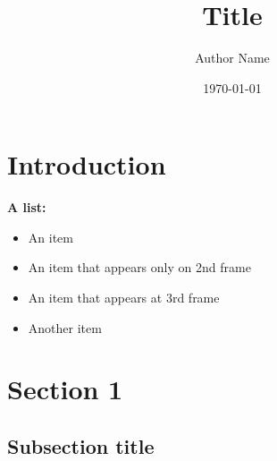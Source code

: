 \documentclass[compress]{beamer}
\title[Short Title]{Title}
\author[Short Author name]{Author Name}
\institute{X group}
\date{\today}
\begin{document}
\begin{frame}
\titlepage

\end{frame}
 
\section{Introduction}

\begin{frame}

\textbf{A list:}
\begin{itemize}
\item An item
\item<2> An item that appears only on 2nd frame
\item<3-> An item that appears at 3rd frame
\item Another item
\end{itemize}

\end{frame}



\section{Section 1}

\subsection{Subsection title}
\end{document}
